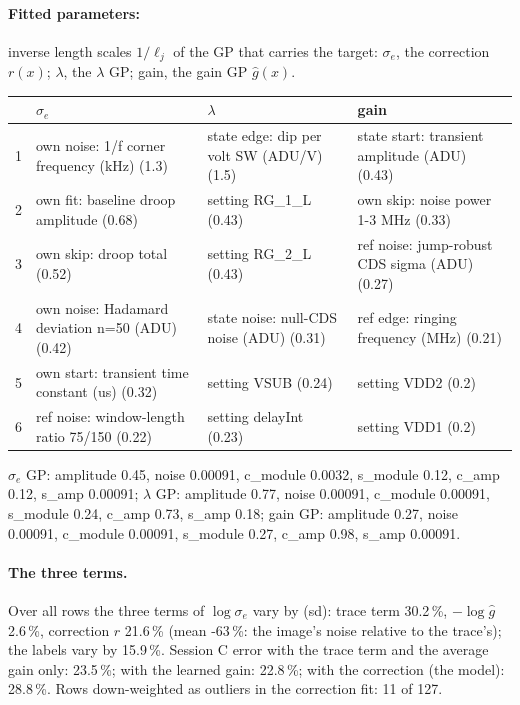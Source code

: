\paragraph{Fitted parameters:} inverse length scales $1/\ell_j$ of the GP that carries the target: $\sigma_e$, the correction $r(x)$; $\lambda$, the $\lambda$ GP; gain, the gain GP $\hat g(x)$.
\begin{center}\footnotesize
\begin{tabular}{rp{}p{}p{}}
\toprule
 & $\sigma_e$ & $\lambda$ & gain \\
\midrule
1 & own noise: 1/f corner frequency (kHz) (1.3) & state edge: dip per volt SW (ADU/V) (1.5) & state start: transient amplitude (ADU) (0.43) \\
2 & own fit: baseline droop amplitude (0.68) & setting RG\_1\_L (0.43) & own skip: noise power 1-3 MHz (0.33) \\
3 & own skip: droop total (0.52) & setting RG\_2\_L (0.43) & ref noise: jump-robust CDS sigma (ADU) (0.27) \\
4 & own noise: Hadamard deviation n=50 (ADU) (0.42) & state noise: null-CDS noise (ADU) (0.31) & ref edge: ringing frequency (MHz) (0.21) \\
5 & own start: transient time constant (us) (0.32) & setting VSUB (0.24) & setting VDD2 (0.2) \\
6 & ref noise: window-length ratio 75/150 (0.22) & setting delayInt (0.23) & setting VDD1 (0.2) \\
\bottomrule
\end{tabular}
\end{center}
{\footnotesize $\sigma_e$ GP: amplitude 0.45, noise 0.00091, c\_module 0.0032, s\_module 0.12, c\_amp 0.12, s\_amp 0.00091; $\lambda$ GP: amplitude 0.77, noise 0.00091, c\_module 0.00091, s\_module 0.24, c\_amp 0.73, s\_amp 0.18; gain GP: amplitude 0.27, noise 0.00091, c\_module 0.00091, s\_module 0.27, c\_amp 0.98, s\_amp 0.00091.}
\paragraph{The three terms.}
Over all rows the three terms of $\log\sigma_e$ vary by (sd): trace term 30.2\,\%, $-\log\hat g$ 2.6\,\%, correction $r$ 21.6\,\% (mean -63\,\%: the image's noise relative to the trace's); the labels vary by 15.9\,\%. Session C error with the trace term and the average gain only: 23.5\,\%; with the learned gain: 22.8\,\%; with the correction (the model): 28.8\,\%. Rows down-weighted as outliers in the correction fit: 11 of 127.

